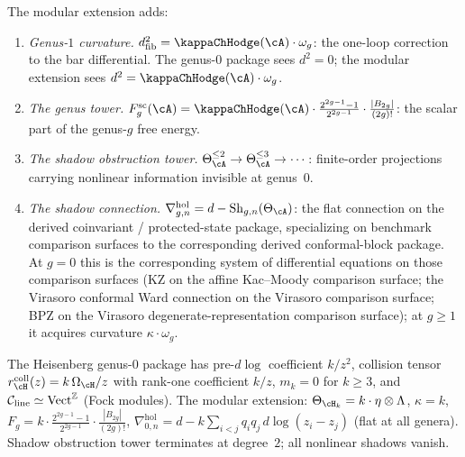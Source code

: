 \begin{construction}
The modular extension adds:
\begin{enumerate}[label=\textup{(\roman*)}]
\item \emph{Genus-$1$ curvature.}
 $d_{\mathrm{fib}}^2=\kappaChHodge(\cA)\cdot\omega_g$: the
 one-loop correction to the bar differential. The genus-$0$
 package sees $d^2=0$; the modular extension sees
 $d^2=\kappaChHodge(\cA)\cdot\omega_g$.
\item \emph{The genus tower.}
 $F_g^{\mathrm{sc}}(\cA)=\kappaChHodge(\cA)\cdot
 \tfrac{2^{2g-1}-1}{2^{2g-1}}\cdot\tfrac{|B_{2g}|}{(2g)!}$: the scalar
 part of the genus-$g$ free energy.
\item \emph{The shadow obstruction tower.}
 $\Theta_\cA^{\le 2}\to\Theta_\cA^{\le 3}\to\cdots$:
 finite-order projections carrying nonlinear
 information invisible at genus~$0$.
\item \emph{The shadow connection.}
 $\nabla^{\mathrm{hol}}_{g,n}=d-\mathrm{Sh}_{g,n}(\Theta_\cA)$:
 the flat connection on the derived coinvariant /
 protected-state package, specializing on benchmark
 comparison surfaces to the corresponding derived
 conformal-block package. At
 $g=0$ this is the corresponding system of differential equations
 on those comparison surfaces (KZ on the affine Kac--Moody
 comparison surface; the Virasoro conformal Ward connection on the
 Virasoro comparison surface; BPZ on the Virasoro
 degenerate-representation comparison surface);
 at $g\ge 1$ it acquires curvature $\kappa\cdot\omega_g$.
\end{enumerate}
\end{construction}

\begin{computation}
\label{comp:vol2-heisenberg-modular-extension}
The Heisenberg genus-$0$ package has pre-\textup{\(d\log\)}
coefficient $k/z^2$, collision tensor
$r^{\mathrm{coll}}_{\cH}(z)=k\,\Omega_{\cH}/z$ with rank-one
coefficient $k/z$, $m_k=0$ for $k\ge 3$, and
$\mathcal C_{\mathrm{line}}\simeq\mathrm{Vect}^{\mathbb{Z}}$ (Fock modules).
The modular extension:
$\Theta_{\cH_k}=k\cdot\eta\otimes\Lambda$,
$\kappa=k$,
$F_g=k\cdot \tfrac{2^{2g-1}-1}{2^{2g-1}}\cdot\tfrac{|B_{2g}|}{(2g)!}$,
$\nabla^{\mathrm{hol}}_{0,n}
=d-k\sum_{i<j}q_iq_j\,d\log(z_i-z_j)$
(flat at all genera).
Shadow obstruction tower terminates at degree~$2$; all nonlinear
shadows vanish.
\end{computation}


